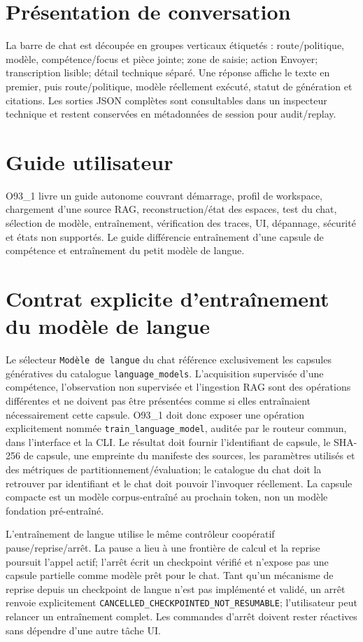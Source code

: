 \documentclass[11pt,a4paper]{article}
\begin{document}
\section{Présentation de conversation}
La barre de chat est découpée en groupes verticaux étiquetés : route/politique, modèle, compétence/focus et pièce jointe; zone de saisie; action Envoyer; transcription lisible; détail technique séparé. Une réponse affiche le texte en premier, puis route/politique, modèle réellement exécuté, statut de génération et citations. Les sorties JSON complètes sont consultables dans un inspecteur technique et restent conservées en métadonnées de session pour audit/replay.
\section{Guide utilisateur}
O93\_1 livre un guide autonome couvrant démarrage, profil de workspace, chargement d'une source RAG, reconstruction/état des espaces, test du chat, sélection de modèle, entraînement, vérification des traces, UI, dépannage, sécurité et états non supportés. Le guide différencie entraînement d'une capsule de compétence et entraînement du petit modèle de langue.
\section{Contrat explicite d'entraînement du modèle de langue}
Le sélecteur \texttt{Modèle de langue} du chat référence exclusivement les capsules génératives du catalogue \texttt{language\_models}. L'acquisition supervisée d'une compétence, l'observation non supervisée et l'ingestion RAG sont des opérations différentes et ne doivent pas être présentées comme si elles entraînaient nécessairement cette capsule. O93\_1 doit donc exposer une opération explicitement nommée \texttt{train\_language\_model}, auditée par le routeur commun, dans l'interface et la CLI. Le résultat doit fournir l'identifiant de capsule, le SHA-256 de capsule, une empreinte du manifeste des sources, les paramètres utilisés et des métriques de partitionnement/évaluation; le catalogue du chat doit la retrouver par identifiant et le chat doit pouvoir l'invoquer réellement. La capsule compacte est un modèle corpus-entraîné au prochain token, non un modèle fondation pré-entraîné.

L'entraînement de langue utilise le même contrôleur coopératif pause/reprise/arrêt. La pause a lieu à une frontière de calcul et la reprise poursuit l'appel actif; l'arrêt écrit un checkpoint vérifié et n'expose pas une capsule partielle comme modèle prêt pour le chat. Tant qu'un mécanisme de reprise depuis un checkpoint de langue n'est pas implémenté et validé, un arrêt renvoie explicitement \texttt{CANCELLED\_CHECKPOINTED\_NOT\_RESUMABLE}; l'utilisateur peut relancer un entraînement complet. Les commandes d'arrêt doivent rester réactives sans dépendre d'une autre tâche UI.
\end{document}
